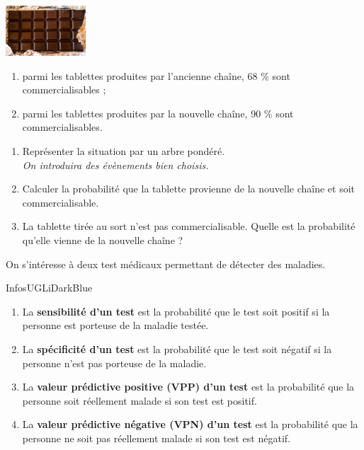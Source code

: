 \documentclass[a4paper,11pt,exos]{nsi} %
\begin{document}
\vspace*{1cm}
\exo{}%
{\includegraphics[width=3cm]{chocolate-1277002_640.jpg}}
\begin{enumerate}[label=\textbullet]
    \item parmi les tablettes produites par l'ancienne chaîne, 68 \% sont commercialisables ;
    \item parmi les tablettes produites par la nouvelle chaîne, 90 \% sont commercialisables.
\end{enumerate}
\begin{enumerate}
    \item Représenter la situation par un arbre pondéré.\\
    \textit{On introduira des évènements bien choisis.}
    \item Calculer la probabilité que la tablette provienne de la nouvelle chaîne et soit commercialisable.
    \item La tablette tirée au sort n'est pas commercialisable. Quelle est la probabilité qu'elle vienne de la nouvelle chaîne ?
\end{enumerate}

\newpage

On s'intéresse à deux test médicaux permettant de détecter des maladies.

\begin{encadrecolore}{Infos}{UGLiDarkBlue}
    \begin{enumerate}[label=\textbullet]
        \item La \textbf{sensibilité d'un test} est la probabilité que le test soit positif si la personne est porteuse de la maladie testée.
        \item La \textbf{spécificité d'un test} est la probabilité que le test soit négatif si la personne n'est pas porteuse de la maladie.
        \item La \textbf{valeur prédictive positive (VPP) d'un test} est la probabilité que la personne soit réellement malade si son test est positif.
        \item La \textbf{valeur prédictive négative (VPN) d'un test} est la probabilité que la personne ne soit pas réellement malade si son test est négatif.
    \end{enumerate}
\end{encadrecolore}
\end{document}
